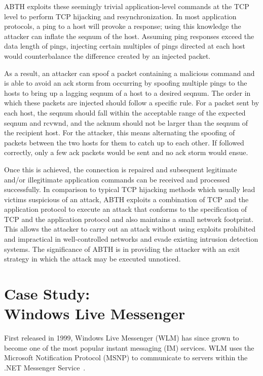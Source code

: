 \documentclass{sig-alternate}
\begin{document}
ABTH exploits these seemingly trivial application-level commands at the TCP level to perform TCP hijacking and resynchronization.
In most application protocols, a ping to a host will provoke a response; using this knowledge the attacker can inflate the seqnum of the host.
Assuming ping responses exceed the data length of pings, injecting certain multiples of pings directed at each host would counterbalance the difference created by an injected packet.

As a result, an attacker can spoof a packet containing a malicious command and is able to avoid an ack storm from occurring by spoofing multiple pings to the hosts to bring up a lagging seqnum of a host to a desired seqnum. 
The order in which these packets are injected should follow a specific rule.
For a packet sent by each host, the seqnum should fall within the acceptable range of the expected seqnum and rcvwnd, and the acknum should not be larger than the seqnum of the recipient host.
For the attacker, this means alternating the spoofing of packets between the two hosts for them to catch up to each other.
If followed correctly, only a few ack packets would be sent and no ack storm would ensue.

Once this is achieved, the connection is repaired and subsequent legitimate and/or illegitimate application commands can be received and processed successfully.
In comparison to typical TCP hijacking methods which usually lead victims suspicious of an attack, ABTH exploits a combination of TCP and the application protocol to execute an attack that conforms to the specification of TCP and the application protocol and also maintains a small network footprint.
This allows the attacker to carry out an attack without using exploits prohibited and impractical in well-controlled networks and evade existing intrusion detection systems.
The significance of ABTH is in providing the attacker with an exit strategy in which the attack may be executed unnoticed.

\section{Case Study:\\Windows Live Messenger}
\label{sec:casestudy}

First released in 1999, Windows Live Messenger (WLM) has since grown to become one of the most popular instant messaging (IM) services.
WLM uses the Microsoft Notification Protocol (MSNP) to communicate to servers within the .NET Messenger Service~\cite{piccard:imsecurity}.
\end{document}
